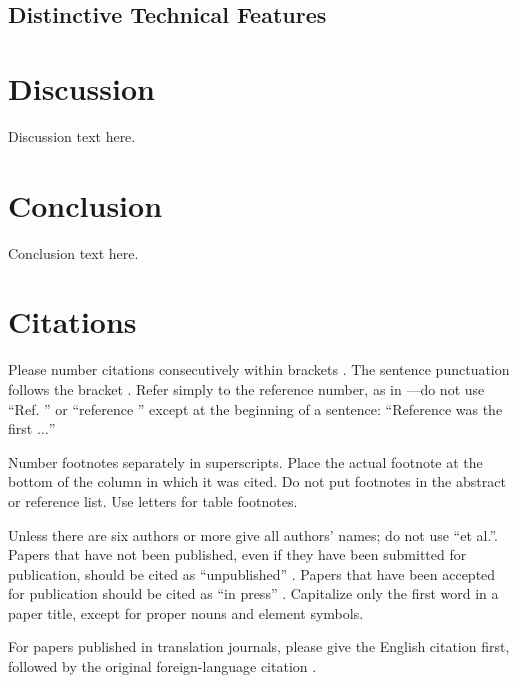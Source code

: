 \documentclass[conference]{IEEEtran}
\begin{document}
\subsection{Distinctive Technical Features}




\section*{Discussion}


Discussion text here.

\section{Conclusion}


Conclusion text here.

\section*{Citations}

Please number citations consecutively within brackets \cite{b1}. The 
sentence punctuation follows the bracket \cite{b2}. Refer simply to the reference 
number, as in \cite{b3}---do not use ``Ref. \cite{b3}'' or ``reference \cite{b3}'' except at 
the beginning of a sentence: ``Reference \cite{b3} was the first $\ldots$''

Number footnotes separately in superscripts. Place the actual footnote at 
the bottom of the column in which it was cited. Do not put footnotes in the 
abstract or reference list. Use letters for table footnotes.

Unless there are six authors or more give all authors' names; do not use 
``et al.''. Papers that have not been published, even if they have been 
submitted for publication, should be cited as ``unpublished'' \cite{b4}. Papers 
that have been accepted for publication should be cited as ``in press'' \cite{b5}. 
Capitalize only the first word in a paper title, except for proper nouns and 
element symbols.

For papers published in translation journals, please give the English 
citation first, followed by the original foreign-language citation \cite{b6}.
\end{document}
